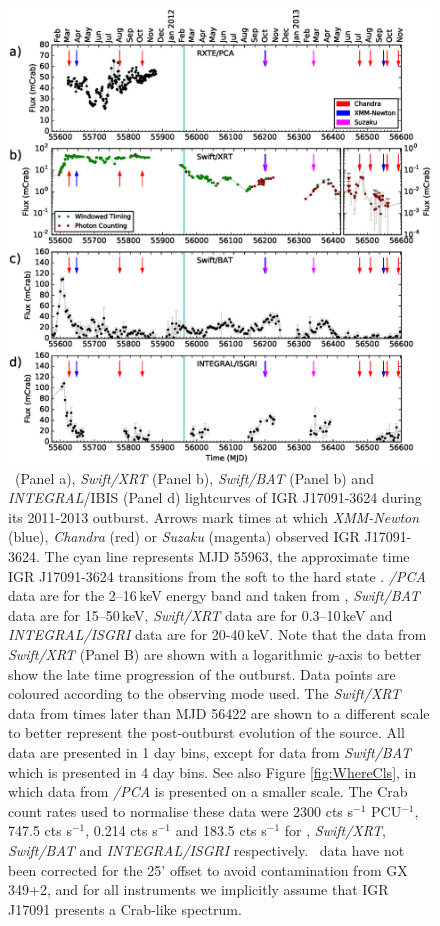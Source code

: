 \begin{figure}
    \includegraphics[width=1.8\columnwidth, trim = {0.75cm 1.0cm 1.0cm 0.8cm},clip]{images/allmis.eps}
    \captionsetup{singlelinecheck=off}
    \caption{\rxte\ (Panel a), \textit{Swift/XRT} (Panel b), \textit{Swift/BAT} (Panel b) and \textit{INTEGRAL}/IBIS (Panel d) lightcurves of IGR J17091-3624 during its 2011-2013 outburst.  Arrows mark times at which \textit{XMM-Newton} (blue), \textit{Chandra} (red) or \textit{Suzaku} (magenta) observed IGR J17091-3624.  The cyan line represents MJD 55963, the approximate time IGR J17091-3624 transitions from the soft to the hard state \citep{Drave_Return}.  \rxte \textit{/PCA} \citep{Jahoda_PCA} data are for the 2--16\,keV energy band and taken from \citep{Altamirano_IGR_FH}, \textit{Swift/BAT} \citep{Barthelmy_BAT} data are for 15--50\,keV, \textit{Swift/XRT} \citep{Burrows_XRT}  data are for 0.3--10\,keV and \textit{INTEGRAL/ISGRI} \citep{Ubertini_IBIS} data are for 20-40\,keV.  Note that the data from \textit{Swift/XRT} (Panel B) are shown with a logarithmic $y$-axis to better show the late time progression of the outburst.  Data points are coloured according to the observing mode used.  The \textit{Swift/XRT} data from times later than MJD 56422 are shown to a different scale to better represent the post-outburst evolution of the source.  All data are presented in 1 day bins, except for data from \textit{Swift/BAT} which is presented in 4 day bins.  See also Figure \ref{fig:WhereCls}, in which data from \rxte \textit{/PCA} is presented on a smaller scale.  The Crab count rates used to normalise these data were 2300 cts s$^{-1}$ PCU$^{-1}$, 747.5 cts s$^{-1}$, 0.214 cts s$^{-1}$ and 183.5 cts s$^{-1}$ for \rxte , \textit{Swift/XRT}, \textit{Swift/BAT} and \textit{INTEGRAL/ISGRI} respectively.  \rxte\ data have not been corrected for the 25' offset to avoid contamination from GX 349+2, and for all instruments we implicitly assume that IGR J17091 presents a Crab-like spectrum.}

\end{figure}
